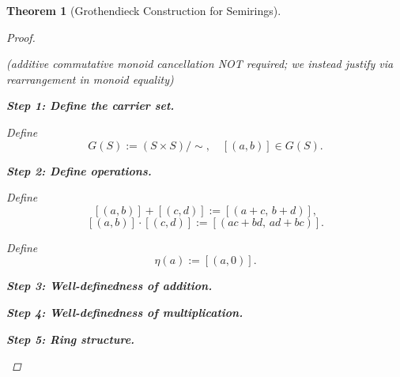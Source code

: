 \documentclass[10pt,a4paper]{book}
\newtheorem{theorem}{Theorem}[section]
\begin{document}
\begin{theorem}[Grothendieck Construction for Semirings]
\begin{proof}
\begin{fitchproof}[arrayenv=tabular]
             

            \close

        \end{fitchproof}

        (additive commutative monoid cancellation NOT required; we instead justify via rearrangement in monoid equality)

        \textbf{Step 1: Define the carrier set.}

        Define
        \[
            G(S) := (S \times S)/\sim,
            \quad [(a,b)] \in G(S).
        \]

        \textbf{Step 2: Define operations.}

        Define
        \[
            [(a,b)] + [(c,d)] := [(a+c,\, b+d)],
        \]
        \[
            [(a,b)] \cdot [(c,d)] := [(ac+bd,\, ad+bc)].
        \]

        Define
        \[
            \eta(a) := [(a,0)].
        \]

        \textbf{Step 3: Well-definedness of addition.}

        \begin{fitchproof}[arrayenv=tabular]


        \end{fitchproof}

        \textbf{Step 4: Well-definedness of multiplication.}

        \begin{fitchproof}[arrayenv=tabular]


        \end{fitchproof}

        \textbf{Step 5: Ring structure.}

        \begin{fitchproof}[arrayenv=tabular]


\end{fitchproof}
\end{proof}
\end{theorem}
\end{document}
